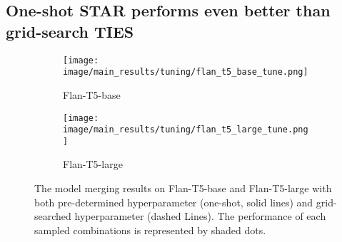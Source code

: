 \begin{table}[h]
\centering
\renewcommand{\arraystretch}{1.3} %
\caption{Results from merging eight fine-tuned Flan-T5-large models. TA is fixed with a scaling factor of \( \alpha = 0.125 \), and TIES is set with \( k = 20 \), using the best-performing DARE drop rate (\( p^* \)).}
\label{tab:dare_comparison}
\end{table}



\subsection{One-shot STAR performs even better than grid-search TIES}
\label{subsec:oneshot_star_is_better}
\begin{figure}[h]
\begin{subfigure}{0.48\textwidth}
\texttt{[image: image/main\_results/tuning/flan\_t5\_base\_tune.png]} 
\caption{Flan-T5-base}
\label{fig:enter-label}
\end{subfigure}
\begin{subfigure}{0.48\textwidth}
\texttt{[image: image/main\_results/tuning/flan\_t5\_large\_tune.png]}
\caption{Flan-T5-large}
\end{subfigure}
\caption{The model merging results on Flan-T5-base and Flan-T5-large with both pre-determined hyperparameter (one-shot, solid lines) and grid-searched hyperparameter (dashed Lines). The performance of each sampled combinations is represented by shaded dots.
}
\label{fig:main_grid}
\end{figure}

